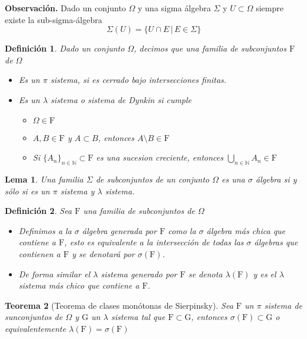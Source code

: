 \documentclass[letterpaper]{book}
\newtheorem{teorema}{Teorema}[section]
\newtheorem{lema}[teorema]{Lema}
\newtheorem{def.}{Definici\'on}[section]
\newcommand{\nat}{\ensuremath{ \mathbb N }}
\newcommand{\obs}{{\newline \noindent \sc \textbf{Observación. }}}
\newcommand{\om}{\ensuremath{\Omega}}
\begin{document}
\obs Dado un conjunto \(\Omega\) y una sigma álgebra \(\Sigma\) y \(U\subset\Omega\) siempre existe la sub-sigma-álgebra
\[
    \Sigma(U)=\{U\cap E\,|\,E\in\Sigma\}
\]

\begin{def.}
Dado un conjunto \(\Omega\), decimos que una familia de subconjuntos \(\mathrm{F}\) de \(\Omega\)
\begin{itemize}
\item Es un \(\pi\) sistema, si es cerrado bajo intersecciones finitas.

\item Es un \(\lambda\) sistema o sistema de Dynkin si cumple
\begin{itemize}
\item \(\Omega\in\mathrm{F}\)
\item \(A,B\in\mathrm{F}\) y \(A\subset B\), entonces \(A\setminus B\in\mathrm{F}\)
\item Si \(\{A_n\}_{n\in\nat}\subset\mathrm{F}\) es una sucesion creciente, entonces \(\bigcup_{n\in\nat}A_n\in\mathrm{F}\)
\end{itemize}
\end{itemize}

\end{def.}
\begin{lema}
    Una familia $\Sigma$ de subconjuntos de un conjunto $\Omega$ es una $\sigma$ álgebra si y sólo si es un $\pi$ sistema y $\lambda$ sistema.
\end{lema}
\begin{def.}
Sea \(\mathrm{F}\) una familia de subconjuntos de \(\Omega\)
\begin{itemize}
\item Definimos a la \(\sigma\) álgebra generada por \(\mathrm{F}\) como la \(\sigma\) álgebra más chica que contiene a \(\mathrm{F}\), esto es equivalente a la intersección de todas las \(\sigma\) álgebras que contienen a \(\mathrm{F}\) y se denotará por \(\sigma(\mathrm{F})\).
\item De forma similar el \(\lambda\) sistema generado por \(\mathrm{F}\) se denota \(\lambda(\mathrm{F})\) y es el \(\lambda\) sistema más chico que contiene a \(\mathrm{F}\).
\end{itemize}
\end{def.}
\begin{teorema}[Teorema de clases monótonas de Sierpinsky]
Sea $\mathrm{F}$ un $\pi$ sistema de sunconjuntos de $\om$ y $\mathrm{G}$ un $\lambda$ sistema tal que $\mathrm{F}\subset\mathrm{G}$, entonces $\sigma(\mathrm{F})\subset\mathrm{G}$ o equivalentemente $\lambda(\mathrm{F})=\sigma(\mathrm{F})$
\end{teorema}
\end{document}
